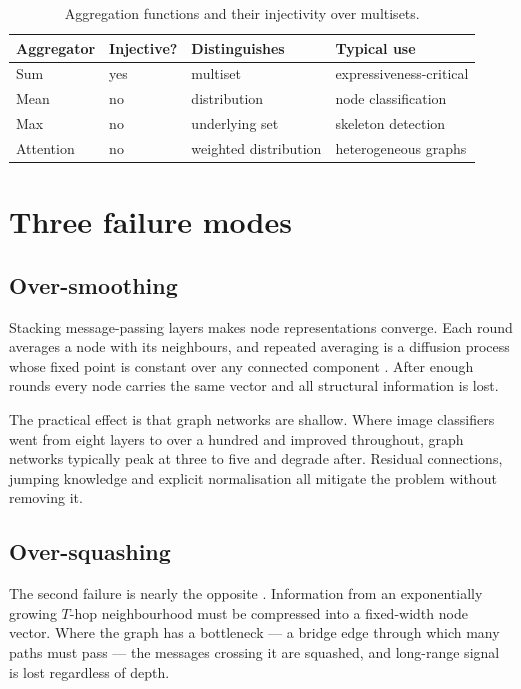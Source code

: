 \documentclass[11pt,a4paper]{article}
\begin{document}
\begin{table}[htbp]
  \centering
  \caption{Aggregation functions and their injectivity over multisets.}
  \label{tab:aggregation}
  \begin{tabular}{llll}
    \toprule
    \textbf{Aggregator} & \textbf{Injective?} & \textbf{Distinguishes} &
      \textbf{Typical use} \\
    \midrule
    Sum \cite{xu2019}       & yes & multiset          & expressiveness-critical \\
    Mean \cite{kipf2017}    & no  & distribution      & node classification \\
    Max \cite{hamilton2017} & no  & underlying set    & skeleton detection \\
    Attention \cite{velickovic2018} & no & weighted distribution & heterogeneous graphs \\
    \bottomrule
  \end{tabular}
\end{table}

\section{Three failure modes}
\label{sec:failure}

\subsection{Over-smoothing}

Stacking message-passing layers makes node representations converge. Each
round averages a node with its neighbours, and repeated averaging is a
diffusion process whose fixed point is constant over any connected component
\cite{li2018}. After enough rounds every node carries the same vector and all
structural information is lost.

The practical effect is that graph networks are shallow. Where image
classifiers went from eight layers to over a hundred and improved throughout,
graph networks typically peak at three to five and degrade after. Residual
connections, jumping knowledge and explicit normalisation all mitigate the
problem without removing it.

\subsection{Over-squashing}

The second failure is nearly the opposite \cite{alon2021}. Information from an
exponentially growing $T$-hop neighbourhood must be compressed into a
fixed-width node vector. Where the graph has a bottleneck --- a bridge edge
through which many paths must pass --- the messages crossing it are squashed,
and long-range signal is lost regardless of depth.
\end{document}

